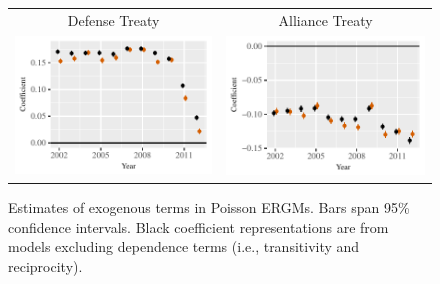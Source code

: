 \documentclass[reqno,onecolumn,letterpaper,12pt]{article}
\begin{document}
\begin{figure}[htp]
\begin{tabular}{c@{\hskip -.4cm}c}
Defense Treaty &
Alliance Treaty\\
\includegraphics[height=.2\textheight, clip=true, trim=0cm .5cm 0cm .1cm]{draft_figures/rl_plots/Defense.pdf}   &
\includegraphics[height=.2\textheight, clip=true, trim=.5cm .5cm 0cm .1cm]{draft_figures/rl_plots/Alliance.pdf}   \\
\end{tabular}
\caption{\label{fig:effectPlots1} Estimates of exogenous terms in Poisson ERGMs. Bars span 95\% confidence intervals. Black coefficient representations are from models excluding dependence terms (i.e., transitivity and reciprocity).}
\end{figure}
\end{document}

